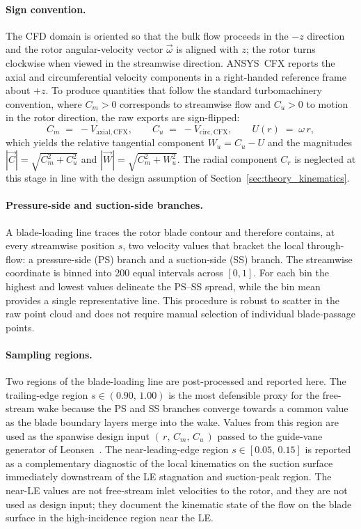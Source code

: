 \paragraph{Sign convention.}
The CFD domain is oriented so that the bulk flow proceeds in the $-z$
direction and the rotor angular-velocity vector $\vec{\omega}$ is
aligned with $z$; the rotor turns clockwise when viewed in the
streamwise direction. ANSYS~CFX reports the axial and circumferential
velocity components in a right-handed reference frame about $+z$. To
produce quantities that follow the standard turbomachinery convention,
where $C_m>0$ corresponds to streamwise flow and $C_u>0$ to motion in
the rotor direction, the raw exports are sign-flipped:
%
\begin{equation}
C_m \;=\; -V_{\mathrm{axial},\mathrm{CFX}}, \qquad
C_u \;=\; -V_{\mathrm{circ},\mathrm{CFX}}, \qquad
U(r) \;=\; \omega\,r,
\label{eq:rdt_sign_convention}
\end{equation}
%
which yields the relative tangential component $W_u = C_u - U$ and the
magnitudes $|\vec{C}|=\sqrt{C_m^{2}+C_u^{2}}$ and
$|\vec{W}|=\sqrt{C_m^{2}+W_u^{2}}$. The radial component $C_r$ is
neglected at this stage in line with the design assumption of
Section~\ref{sec:theory_kinematics}.
 
\paragraph{Pressure-side and suction-side branches.}
A blade-loading line traces the rotor blade contour and therefore
contains, at every streamwise position $s$, two velocity values that
bracket the local through-flow: a pressure-side (PS) branch and a
suction-side (SS) branch. The streamwise coordinate is binned into 200
equal intervals across $[0,1]$. For each bin the highest and lowest
values delineate the PS--SS spread, while the bin mean provides a single
representative line. This procedure is robust to scatter in the raw
point cloud and does not require manual selection of individual
blade-passage points.
 
\paragraph{Sampling regions.}
Two regions of the blade-loading line are post-processed and reported
here. The trailing-edge region $s\in(0.90,\,1.00)$ is the most defensible
proxy for the free-stream wake because the PS and SS branches converge
towards a common value as the blade boundary layers merge into the wake.
Values from this region are used as the spanwise design input
$(\,r,\,C_m,\,C_u\,)$ passed to the guide-vane generator of
Leonsen~\cite{Leonsen2025}. The near-leading-edge region
$s\in[0.05,\,0.15]$ is reported as a complementary diagnostic of the
local kinematics on the suction surface immediately downstream of the
LE stagnation and suction-peak region. The near-LE values are not
free-stream inlet velocities to the rotor, and they are not used as
design input; they document the kinematic state of the flow on the
blade surface in the high-incidence region near the LE.
 
